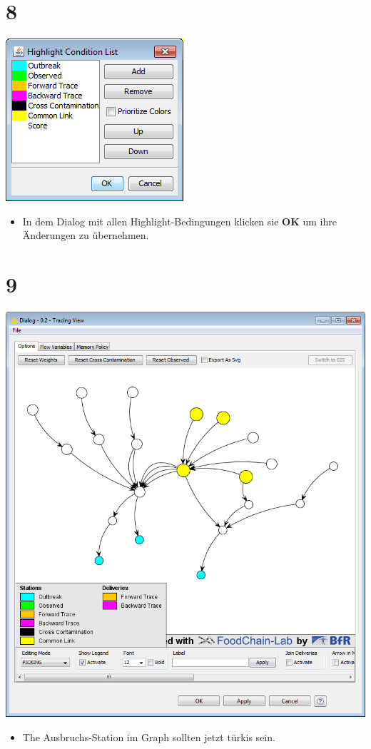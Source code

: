 \documentclass{beamer}
\begin{document}
\section{8}
\begin{frame}
	\begin{center}
  		\includegraphics[height=0.6\textheight]{8.png}
	\end{center}
	\begin{itemize}
		\item In dem Dialog mit allen Highlight-Bedingungen klicken sie \textbf{OK} um ihre Änderungen zu übernehmen.
	\end{itemize}
\end{frame}

\section{9}
\begin{frame}
	\begin{center}
  		\includegraphics[height=0.6\textheight]{9.png}
	\end{center}
	\begin{itemize}
		\item The Ausbruchs-Station im Graph sollten jetzt türkis sein.
	\end{itemize}
\end{frame}
\end{document}
